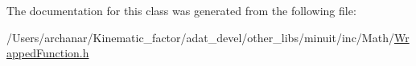 The documentation for this class was generated from the following file\+:\begin{DoxyCompactItemize}
\item 
/\+Users/archanar/\+Kinematic\+\_\+factor/adat\+\_\+devel/other\+\_\+libs/minuit/inc/\+Math/\mbox{\hyperlink{other__libs_2minuit_2inc_2Math_2WrappedFunction_8h}{Wrapped\+Function.\+h}}\end{DoxyCompactItemize}
